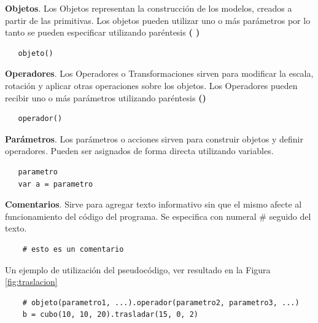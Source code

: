 \textbf{Objetos}. Los Objetos representan la construcción de los modelos, creados a partir  de las primitivas. Los objetos pueden utilizar uno o más parámetros por lo tanto se pueden especificar utilizando paréntesis \textbf{( )}

\begin{verbatim}
   objeto()
\end{verbatim}


\textbf{Operadores}. Los Operadores o Transformaciones sirven para modificar la escala, rotación y aplicar otras operaciones sobre los objetos. Los Operadores pueden recibir uno o más parámetros utilizando paréntesis \textbf{()}

\begin{verbatim}
   operador()
\end{verbatim}


\textbf{Parámetros}. Los parámetros o acciones sirven para construir objetos y definir operadores. Pueden ser asignados de forma directa utilizando variables.

\begin{verbatim}
   parametro
   var a = parametro
\end{verbatim}

\textbf{Comentarios}. Sirve para agregar texto informativo sin que el mismo afecte al funcionamiento del código del programa. Se especifica con numeral \# seguido del texto.
\begin{verbatim}
    # esto es un comentario
\end{verbatim}

\vspace{5mm}
Un ejemplo de utilización del pseudocódigo, ver resultado en la Figura \ref{fig:traslacion}

\begin{verbatim}
    # objeto(parametro1, ...).operador(parametro2, parametro3, ...)
    b = cubo(10, 10, 20).trasladar(15, 0, 2) 
\end{verbatim}


\clearpage
